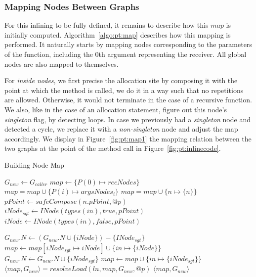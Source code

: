 \subsubsection{Mapping Nodes Between Graphs}
\label{sec:pt:allocinline}
For this inlining to be fully defined, it remains to describe how this $map$ is
initially computed. Algorithm~\ref{algo:pt:map} describes how this mapping is
performed. It naturally starts by mapping nodes corresponding to the parameters
of the function, including the 0th argument representing the receiver. All
global nodes are also mapped to themselves.

For \emph{inside nodes}, we first precise the allocation site by composing it
with the point at which the method is called, we do it in a way such that no
repetitions are allowed. Otherwise, it would not terminate in the case of a
recursive function. We also, like in the case of an allocation statement,
figure out this node's \emph{singleton} flag, by detecting loops. In case we
previously had a \emph{singleton} node and detected a cycle, we replace it with
a \emph{non-singleton} node and adjust the map accordingly. We display in
Figure~\ref{fig:pt:map1} the mapping relation between the two graphs at the point
of the method call in Figure~\ref{fig:pt:inlinecode}.
\begin{algorithm}
\caption{Building Node Map}\label{algo:pt:map}
\begin{algorithmic}[1]
    \State $G_{new} \gets G_{caller}$
    \State $map \gets \{ P(0) \mapsto recNodes \} $
        \State $map = map \cup \{ P(i) \mapsto argsNodes_i \}$
    \EndFor
        \State $map = map \cup \{ n \mapsto \{ n \} \}$
    \EndFor
        \State $pPoint \gets safeCompose(n.pPoint, @p)$
        \State $iNode_{sgt} \gets INode(types(in), true, pPoint)$
        \State $iNode \gets INode(types(in), false, pPoint)$

            \State $G_{new}.N \gets (G_{new}.N \cup \{ iNode \}) - \{ INode_{sgt} \}$
            \State $map \gets map[iNode_{sgt} \mapsto iNode] \cup \{in \mapsto \{iNode\}\}$
        \Else
            \State $G_{new}.N \gets G_{new}.N \cup \{ iNode_{sgt} \}$
            \State $map \gets map \cup \{in \mapsto \{iNode_{sgt}\}\}$
        \EndIf
    \EndFor
        \State $\langle map, G_{new} \rangle = resolveLoad(ln, map, G_{new}, @p)$
    \EndFor
    \State \Return $\langle map, G_{new} \rangle$
\EndFunction
\end{algorithmic}
\end{algorithm}
